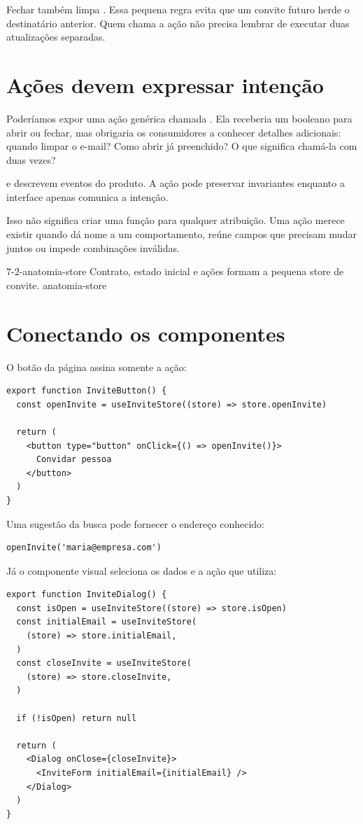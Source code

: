 Fechar também limpa . Essa pequena regra evita que um
convite futuro herde o destinatário anterior. Quem chama a ação não precisa
lembrar de executar duas atualizações separadas.

\section{Ações devem expressar intenção}

Poderíamos expor uma ação genérica chamada . Ela receberia um
booleano para abrir ou fechar, mas obrigaria os consumidores a conhecer detalhes
adicionais: quando limpar o e-mail? Como abrir já preenchido? O que significa
chamá-la com  duas vezes?

 e  descrevem eventos do produto. A ação
pode preservar invariantes enquanto a interface apenas comunica a intenção.

Isso não significa criar uma função para qualquer atribuição. Uma ação merece
existir quando dá nome a um comportamento, reúne campos que precisam mudar juntos
ou impede combinações inválidas.

\imagemcapitulo
  {7-2-anatomia-store}
  {Contrato, estado inicial e ações formam a pequena store de convite.}
  {anatomia-store}

\section{Conectando os componentes}

O botão da página assina somente a ação:

\begin{lstlisting}
export function InviteButton() {
  const openInvite = useInviteStore((store) => store.openInvite)

  return (
    <button type="button" onClick={() => openInvite()}>
      Convidar pessoa
    </button>
  )
}
\end{lstlisting}

Uma sugestão da busca pode fornecer o endereço conhecido:

\begin{lstlisting}
openInvite('maria@empresa.com')
\end{lstlisting}

Já o componente visual seleciona os dados e a ação que utiliza:

\begin{lstlisting}
export function InviteDialog() {
  const isOpen = useInviteStore((store) => store.isOpen)
  const initialEmail = useInviteStore(
    (store) => store.initialEmail,
  )
  const closeInvite = useInviteStore(
    (store) => store.closeInvite,
  )

  if (!isOpen) return null

  return (
    <Dialog onClose={closeInvite}>
      <InviteForm initialEmail={initialEmail} />
    </Dialog>
  )
}
\end{lstlisting}

